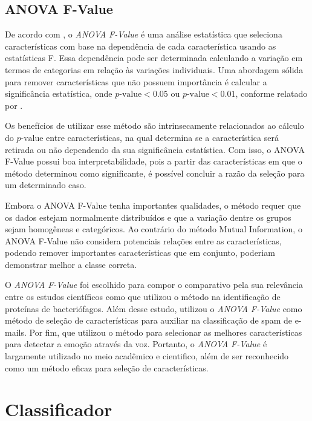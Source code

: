 \subsection{ANOVA F-Value}

De acordo com \cite{doan2020designing}, o \textit{ANOVA F-Value} é uma análise estatística que seleciona características com base na dependência de cada característica usando as estatísticas F. Essa dependência pode ser determinada calculando a variação em termos de categorias em relação às variações individuais. Uma abordagem sólida para remover características que não possuem importância é calcular a significância estatística, onde $p\text{-value} < 0.05$ ou $p\text{-value} < 0.01$, conforme relatado por \cite{campbell2018differentially}.

Os benefícios de utilizar esse método são intrinsecamente relacionados ao cálculo do $p\text{-value}$ entre características, na qual determina se a característica será retirada ou não dependendo da sua significância estatística. Com isso, o ANOVA F-Value possui boa interpretabilidade, pois a partir das características em que o método determinou como significante, é possível concluir a razão da seleção para um determinado caso.

Embora o ANOVA F-Value tenha importantes qualidades, o método requer que os dados estejam normalmente distribuídos e que a variação dentre os grupos sejam homogêneas e categóricos. Ao contrário do método Mutual Information, o ANOVA F-Value não considera potenciais relações entre as características, podendo remover importantes características que em conjunto, poderiam demonstrar melhor a classe correta.

O \textit{ANOVA F-Value} foi escolhido para compor o comparativo pela sua relevância entre os estudos científicos como \cite{ding2014identification} que utilizou o método na identificação de proteínas de bacteriófagos. Além desse estudo, \cite{elssied2014novel} utilizou o \textit{ANOVA F-Value} como método de seleção de características para auxiliar na classificação de spam de e-mails. Por fim, \cite{sheikhan2013modular} que utilizou o método para selecionar as melhores características para detectar a emoção através da voz. Portanto, o \textit{ANOVA F-Value} é largamente utilizado no meio acadêmico e cientifico, além de ser reconhecido como um método eficaz para seleção de características.

\section{Classificador}
\label{subsec-classificador}


